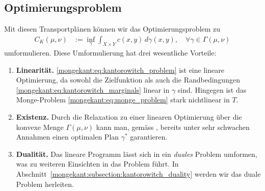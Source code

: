 \subsection{Optimierungsproblem}
Mit diesen Transportplänen können wir das Optimierungsproblem zu 
\begin{align}
C_K(\mu, \nu)
&:=
\inf_{\gamma}
\int_{X \times Y} c(x,y)\, d\gamma(x,y)
,\quad
\forall \gamma \in \Gamma(\mu, \nu)
\label{mongekant:eq:kantorowitch_problem}
\end{align}
umformulieren.
Diese Umformulierung hat drei wesentliche Vorteile:
\begin{enumerate}
\item \textbf{Linearität.}
%
\eqref{mongekant:eq:kantorowitch_problem}
ist eine lineare Optimierung,
da sowohl die Zielfunktion
als auch die Randbedingungen \eqref{mongekant:eq:kantorowitch_marginals}
linear in $\gamma$ sind.
Hingegen ist das Monge-Problem \eqref{mongekant:eq:monge_problem}
stark nichtlinear in $T$.
\item \textbf{Existenz.}
%
Durch die Relaxation zu einer linearen Optimierung
über die konvexe Menge $\Gamma(\mu,\nu)$ kann man,
gemäss \cite{mongekant:ethlecture},
bereits unter sehr schwachen Annahmen
einen optimalen Plan $\gamma^{\ast}$ garantieren.
\item \textbf{Dualität.}
%
Das lineare Programm lässt sich in ein \emph{duales} Problem umformen,
was zu weiteren Einsichten in das Problem führt.
%
In Abschnitt~\ref{mongekant:subsection:kantorowitch_duality} werden
wir das duale Problem herleiten.
\end{enumerate}

